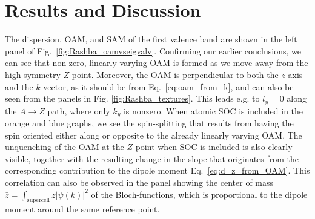 \section{Results and Discussion}
The dispersion, OAM, and SAM of the first valence band are shown in the left panel of Fig.~\ref{fig:Rashba_oamvseigvalv}. Confirming our earlier conclusions, we can see that non-zero, linearly varying OAM is formed as we move away from the high-symmetry $Z$-point. Moreover, the OAM is perpendicular to both the $z$-axis and the $k$ vector, as it should be from Eq.~\ref{eq:oam_from_k}, and can also be seen from the panels in Fig. \ref{fig:Rashba_textures}. This leads e.g. to $l_y=0$ along the $A \to Z$ path, where only $k_y$ is nonzero. When atomic SOC is included in the orange and blue graphs, we see the spin-splitting that results from having the spin oriented either along or opposite to the already linearly varying OAM. The unquenching of the OAM at the $Z$-point when SOC is included is also clearly visible, together with the resulting change in the slope that originates from the corresponding contribution to the dipole moment Eq.~\ref{eq:d_z_from_OAM}. This correlation can also be observed in the panel showing the center of mass $\bar{z}=\int_{\textrm{supercell}}z |\psi(k)|^2$ of the Bloch-functions, which is proportional to the dipole moment around the same reference point.

